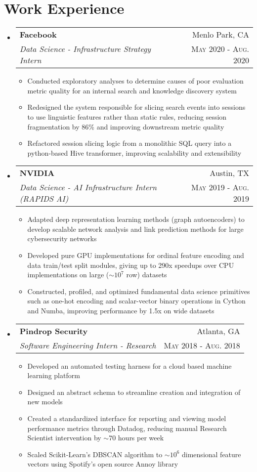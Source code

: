 \documentclass[letterpaper,11pt]{article}
\makeatletter
\newcommand{\resumePlainItem}[1]{
  \item\small{#1 \vspace{-1.0pt}}
}
\newcommand{\resumeSubheading}[4]{
  \vspace{-1pt}\item[]
    \begin{tabular*}{0.97\textwidth}{l@{\extracolsep{\fill}}r}
      \textbf{#1} & #2 \\
      \textit{\small#3} & \textsc{\small #4} \\ %
    \end{tabular*}\vspace{-5pt}
}
\newcommand{\resumeSubHeadingListStart}{\begin{itemize}[leftmargin=*]}
\newcommand{\resumeSubHeadingListEnd}{\end{itemize}}
\newcommand{\resumeItemListStart}{\begin{itemize}}
\newcommand{\resumeItemListEnd}{\end{itemize}\vspace{-5pt}}
\newenvironment{resumeItemList}{\resumeItemListStart}{\resumeItemListEnd}
\newenvironment{resumeSubheadingList}{\resumeSubHeadingListStart}{\resumeSubHeadingListEnd}
\makeatother
\begin{document}
\section{Work Experience}
  \begin{resumeSubheadingList}
    \resumeSubheading
    {Facebook}{Menlo Park, CA}
    {Data Science - Infrastructure Strategy Intern}{May 2020 - Aug. 2020}
    \begin{resumeItemList}
      \resumePlainItem{Conducted exploratory analyses to determine causes of poor evaluation
      metric quality for an internal search and knowledge discovery system}
      \resumePlainItem{Redesigned the system responsible for slicing search events into sessions
      to use linguistic features rather than static rules, reducing session fragmentation by
      86\% and improving downstream metric quality}
      \resumePlainItem{Refactored session slicing logic from a monolithic
      SQL query into a python-based Hive transformer, improving scalability and extensibility}
    \end{resumeItemList}
    \resumeSubheading
      {NVIDIA}{Austin, TX}
      {Data Science - AI Infrastructure Intern (RAPIDS AI)}{May 2019 - Aug. 2019}
      \begin{resumeItemList}
        \resumePlainItem%
        {Adapted deep representation learning methods (graph autoencoders) to develop scalable
        network analysis and link prediction methods for large cybersecurity networks}
        \resumePlainItem%
        {Developed pure GPU implementations for ordinal feature encoding and data train/test split modules,
        giving up to 290x speedups over CPU implementations on large ($\sim 10^7$ row) datasets}
        \resumePlainItem%
        {Constructed, profiled, and optimized fundamental data science primitives such as one-hot encoding and scalar-vector binary operations
        in Cython and Numba, improving performance by 1.5x on wide datasets}
      \end{resumeItemList}

    \resumeSubheading
    {Pindrop Security}{Atlanta, GA}
    {Software Engineering Intern - Research}{May 2018 - Aug. 2018}
    \begin{resumeItemList}
      \resumePlainItem%
      {Developed an automated testing harness for a cloud based machine learning platform}
      \resumePlainItem%
      {Designed an abstract schema to streamline creation and integration of new models}
      \resumePlainItem%
      {Created a standardized interface for reporting and viewing model performance metrics through
      Datadog, reducing manual Research Scientist intervention by $\sim 70$ hours per week}
      \resumePlainItem%
      {Scaled Scikit-Learn's DBSCAN algorithm to $\sim 10^6$ dimensional feature vectors using 
      Spotify's open source Annoy library}
    \end{resumeItemList}
  \end{resumeSubheadingList}
\end{document}
